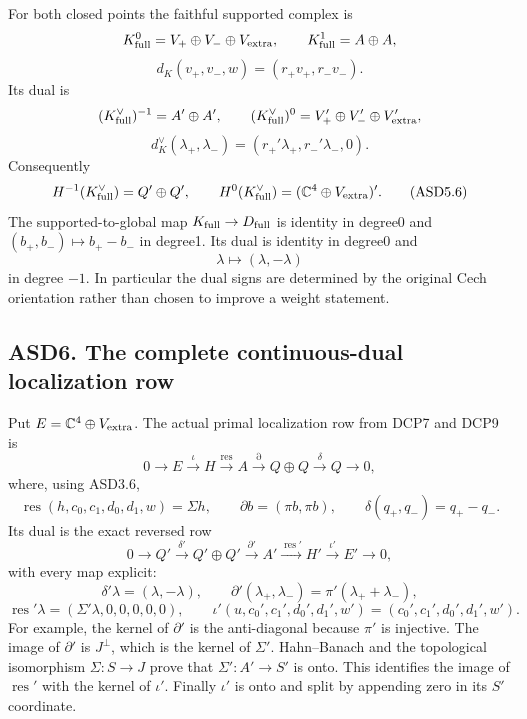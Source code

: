 For both closed points the faithful supported complex is \[
 K_{\rm full}^0=V_+\oplus V_-\oplus V_{\rm extra},\qquad
 K_{\rm full}^1=A\oplus A,
\] \[
 d_K(v_+,v_-,w)=(r_+v_+,r_-v_-).
 \tag{ASD5.4}
\] Its dual is \[
 (K_{\rm full}^\vee)^{-1}=A'\oplus A',\qquad
 (K_{\rm full}^\vee)^0=V_+'\oplus V_-'\oplus V_{\rm extra}',
\] \[
 d_K^\vee(\lambda_+,\lambda_-)
 =(r_+'\lambda_+,r_-'\lambda_-,0).
 \tag{ASD5.5}
\] Consequently \[
 H^{-1}(K_{\rm full}^\vee)=Q'\oplus Q',\qquad
 H^0(K_{\rm full}^\vee)
 =(\mathbb C^4\oplus V_{\rm extra})'.
 \tag{ASD5.6}
\] The supported-to-global map \(K_{\rm full}\to D_{\rm full}\) is
identity in degree0 and \((b_+,b_-)\mapsto b_+-b_-\) in degree1. Its
dual is identity in degree0 and \[
 \lambda\longmapsto(\lambda,-\lambda)
 \tag{ASD5.7}
\] in degree \(-1\). In particular the dual signs are determined by the
original Cech orientation rather than chosen to improve a weight
statement.

\subsection{ASD6. The complete continuous-dual localization
row}\label{asd6.-the-complete-continuous-dual-localization-row}

Put \(E=\mathbb C^4\oplus V_{\rm extra}\). The actual primal
localization row from DCP7 and DCP9 is \[
 0\to E\xrightarrow{\iota}H\xrightarrow{\operatorname{res}}A
 \xrightarrow{\partial}Q\oplus Q\xrightarrow{\delta}Q\to0,
 \tag{ASD6.1}
\] where, using ASD3.6, \[
 \operatorname{res}(h,c_0,c_1,d_0,d_1,w)=\Sigma h,\qquad
 \partial b=(\pi b,\pi b),\qquad
 \delta(q_+,q_-)=q_+-q_-.
 \tag{ASD6.2}
\] Its dual is the exact reversed row \[
 \boxed{
 0\to Q'\xrightarrow{\delta'}Q'\oplus Q'
 \xrightarrow{\partial'}A'
 \xrightarrow{\operatorname{res}'}H'
 \xrightarrow{\iota'}E'\to0,
 }
 \tag{ASD6.3}
\] with every map explicit: \[
 \delta'\lambda=(\lambda,-\lambda),\qquad
 \partial'(\lambda_+,\lambda_-)=\pi'(\lambda_++\lambda_-),
\] \[
 \operatorname{res}'\lambda=(\Sigma'\lambda,0,0,0,0,0),
 \qquad
 \iota'(u,c_0',c_1',d_0',d_1',w')
 =(c_0',c_1',d_0',d_1',w').
 \tag{ASD6.4}
\] For example, the kernel of \(\partial'\) is the anti-diagonal because
\(\pi'\) is injective. The image of \(\partial'\) is \(J^\perp\), which
is the kernel of \(\Sigma'\). Hahn--Banach and the topological
isomorphism \(\Sigma:S\to J\) prove that \(\Sigma':A'\to S'\) is onto.
This identifies the image of \(\operatorname{res}'\) with the kernel of
\(\iota'\). Finally \(\iota'\) is onto and split by appending zero in
its \(S'\) coordinate.

